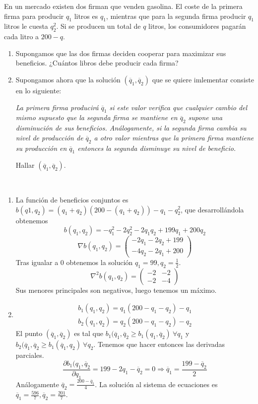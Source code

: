 \documentclass[twoside]{article}
\begin{document}
\begin{ejercicio}{11}
En un mercado existen dos firman que venden gasolina. El coste de la primera firma para producir $q_1$ litros es $q_1$, mientras que para la segunda firma producir $q_1$ litros le cuesta $q_2^2$. Si se producen un total de $q$ litros, los consumidores pagarán cada litro a $200-q$.
\begin{enumerate}
\item Supongamos que las dos firmas deciden cooperar para maximizar sus beneficios. ¿Cuántos libros debe producir cada firma?
\item Supongamos ahora que la solución $(\overline{q}_1,\overline{q}_2)$ que se quiere imlementar consiste en lo siguiente:

\emph{La primera firma producirá $\overline{q}_1$ si este valor verifica que cualquier cambio del mismo supuesto que la segunda firma se mantiene en $\overline{q}_2$ supone una disminución de sus beneficios. Análogamente, si la segunda firma cambia su nivel de producción de $\overline{q}_2$ a otro valor mientras que la primera firma mantiene su producción en $\overline{q}_1$ entonces la segunda disminuye su nivel de beneficio.}

Hallar $(\overline{q}_1,\overline{q}_2)$.
\end{enumerate}
\begin{solucion}\
\begin{enumerate}


\item La función de beneficios conjuntos es $b(q1,q_2)=(q_1+q_2)(200-(q_1+q_2))-q_1-q_2^2$, que desarrollándola obtenemos
$$b(q_1,q_2)=-q_1^2-2q_2^2-2q_1q_2+199q_1+200q_2$$
$$\nabla b(q_1,q_2)=\begin{pmatrix}
-2q_1-2q_2+199\\
-4q_2-2q_1+200
\end{pmatrix}$$
Tras igualar a 0 obtenemos la solución $q_1=99,q_2=\frac{1}{2}$. 
$$\nabla^2b(q_1,q_2)=\begin{pmatrix}
-2 & -2\\
-2 & -4
\end{pmatrix}$$
Sus menores principales son negativos, luego tenemos un máximo.
\item 
\begin{gather*}
b_1(q_1,q_2)=q_1(200-q_1-q_2)-q_1\\
b_2(q_1,q_2)=q_2(200-q_1-q_2)-q_2
\end{gather*}
El punto $(\overline{q}_1,\overline{q}_2)$ es tal que $b_1(\overline{q}_1,\overline{q}_2\geq b_1(q_1,\overline{q}_2)\ \forall q_1$ y $b_2(\overline{q}_1,\overline{q}_2\geq b_1(\overline{q}_1,q_2)\ \forall q_2$. Tenemos que hacer entonces las derivadas parciales.
$$\frac{\partial b_1(q_1,\overline{q}_2}{\partial q_1}=199-2q_1-\overline{q}_2=0\Rightarrow \overline{q}_1=\frac{199-\overline{q}_2}{2}$$
Análogamente $\overline{q}_2=\frac{200-\overline{q}_1}{4}$. La solución al sistema de ecuaciones es $\overline{q}_1=\frac{596}{7},\overline{q}_2=\frac{201}{7}$.
\end{enumerate}
\end{solucion}
\end{ejercicio}
\end{document}
